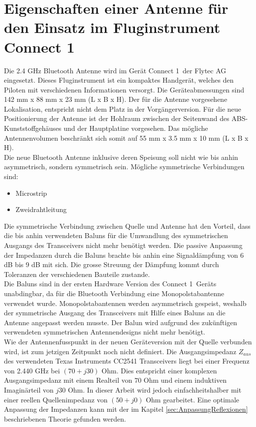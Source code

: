 \section{Eigenschaften einer Antenne für den Einsatz im Fluginstrument \glqq Connect 1\grqq }\label{sec:EigenschaftenAntenne}
Die 2.4 GHz Bluetooth Antenne wird im Gerät \glqq Connect 1\grqq \ der Flytec AG eingesetzt. Dieses Fluginstrument ist ein kompaktes Handgerät, welches den Piloten mit verschiedenen Informationen versorgt. Die Geräteabmessungen sind 142 mm x 88 mm x 23 mm (L x B x H). Der für die Antenne vorgesehene Lokalisation, entspricht nicht dem Platz in der Vorgängerversion. Für die neue Positionierung der Antenne ist der Hohlraum zwischen der Seitenwand des ABS-Kunststoffgehäuses und der Hauptplatine vorgesehen. Das mögliche Antennenvolumen beschränkt sich somit auf 55 mm x 3.5 mm x 10 mm (L x B x H).\\
Die neue Bluetooth Antenne inklusive deren Speisung soll nicht wie bis anhin asymmetrisch, sondern symmetrisch sein. Mögliche symmetrische Verbindungen sind:
\begin{itemize}
\item Microstrip 
\item Zweidrahtleitung
\end{itemize}
Die symmetrische Verbindung zwischen Quelle und Antenne hat den Vorteil, dass die bis anhin verwendeten Baluns für die Umwandlung des symmetrischen Ausgangs des Transceivers nicht mehr benötigt werden. Die passive Anpassung der Impedanzen durch die Baluns brachte bis anhin eine Signaldämpfung von 6 dB bis 9 dB mit sich. Die grosse Streuung der Dämpfung kommt durch Toleranzen der verschiedenen Bauteile zustande.\\
Die Baluns sind in der ersten Hardware Version des \glqq Connect 1\grqq \ Geräts unabdingbar, da für die Bluetooth Verbindung eine Monopolstabantenne verwendet wurde. Monopolstabantennen werden asymmetrisch gespeist, weshalb der symmetrische Ausgang des Transceivers mit Hilfe eines Baluns an die Antenne angepasst werden musste. Der Balun wird aufgrund des zukünftigen verwendeten symmetrischen Antennendesigns nicht mehr benötigt.\\
Wie der Antennenfusspunkt in der neuen Geräteversion mit der Quelle verbunden wird, ist zum jetzigen Zeitpunkt noch nicht definiert. Die Ausgangsimpedanz $Z_{aus}$ des verwendeten Texas Instruments CC2541 Transceivers liegt bei einer Frequenz von 2.440 GHz bei $(70+j30)$ Ohm. Dies entspricht einer komplexen Ausgangsimpedanz mit einem Realteil von $70$ Ohm und einem induktiven Imaginärteil von $j30$ Ohm. In dieser Arbeit wird  jedoch einfachheitshalber mit einer reellen Quellenimpedanz von $(50+j0)$ Ohm gearbeitet. Eine optimale Anpassung der Impedanzen kann mit der im Kapitel \ref{sec:AnpassungReflexionen} beschriebenen Theorie gefunden werden.\\
